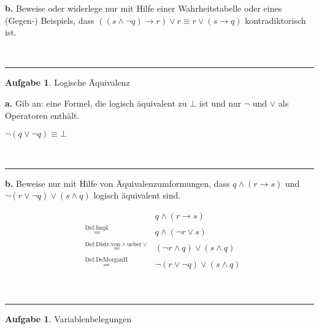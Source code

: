 \documentclass[10pt,leqno ]{article}
\newcommand\customeq[1]{\overset{\mathrm{#1}}{=}}
\theoremstyle{definition}
\newtheorem{problem}[theorem]{Aufgabe}
\newenvironment{solution}[1][L]{\begin{doublespace}\textbf{#1.}\quad }{\ \rule{0.5em}{0.5em}\end{doublespace}}
\begin{document}
\begin{solution}[b]
Beweise oder widerlege nur mit Hilfe einer Wahrheitstabelle oder eines (Gegen-) Beispiels, dass \( ((s \land \lnot q) \rightarrow r) \lor r \equiv r \lor (s \rightarrow q) \) kontradiktorisch ist.

\end{solution}


\begin{problem}
    Logische Äquivalenz
\end{problem}

\begin{solution}[a]
Gib an: eine Formel, die logisch äquivalent zu \( \bot \) ist und nur  \( \lnot \) und \( \lor \) als Operatoren enthält. 

\( \lnot (q \lor \lnot q) \equiv \bot \)
    
\end{solution}
    
\begin{solution}[b]
Beweise nur mit Hilfe von Äquivalenzumformungen, dass \( q \land (r \rightarrow s) \) und \( \lnot(r \lor \lnot q) \lor (s \land q) \) logisch äquivalent sind.    

\begin{equation*}
    \begin{aligned}
    & & q \land (r \rightarrow s) \\
    & \customeq{Def. Impl.} & q \land (\lnot r \lor s)  \\
    & \customeq{Def. Distr. von \land ueber \lor} & (\lnot r \land q) \lor (s \land q) \\
    & \customeq{Def. De Morgan II} & \lnot(r \lor \lnot q) \lor (s \land q) \\
    \end{aligned}
\end{equation*}

\end{solution}


\begin{problem}
    Variablenbelegungen
\end{problem}
\end{document}
